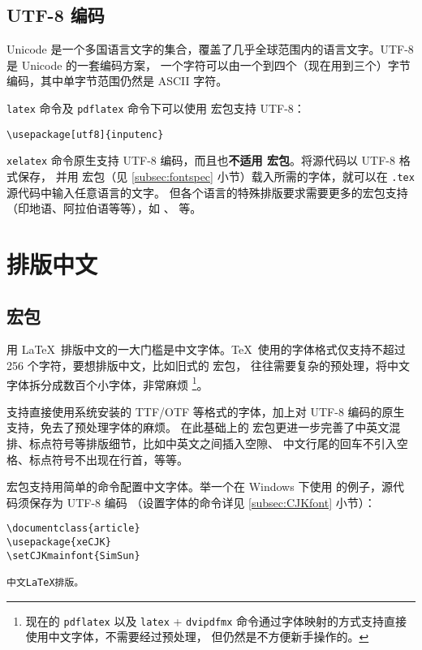 \subsection{UTF-8 编码}\label{subsec:utf8}

Unicode 是一个多国语言文字的集合，覆盖了几乎全球范围内的语言文字。UTF-8 是 Unicode 的一套编码方案，
一个字符可以由一个到四个（现在用到三个）字节编码，其中单字节范围仍然是 ASCII 字符。

\texttt{latex} 命令及 \texttt{pdflatex} 命令下可以使用  宏包支持 UTF-8：
\begin{verbatim}
\usepackage[utf8]{inputenc}
\end{verbatim}

\texttt{xelatex} 命令原生支持 UTF-8 编码，而且也\textbf{不适用  宏包}。将源代码以 UTF-8 格式保存，
并用  宏包（见 \ref{subsec:fontspec} 小节）载入所需的字体，就可以在 \texttt{.tex} 源代码中输入任意语言的文字。
但各个语言的特殊排版要求需要更多的宏包支持（印地语、阿拉伯语等等），如 、  等。

\section{排版中文}

\subsection{ 宏包}

用 \LaTeX\ 排版中文的一大门槛是中文字体。\TeX\ 使用的字体格式仅支持不超过 256 个字符，要想排版中文，比如旧式的  宏包，
往往需要复杂的预处理，将中文字体拆分成数百个小字体，非常麻烦%
\footnote{现在的 \texttt{pdflatex} 以及 \texttt{latex} + \texttt{dvipdfmx} 命令通过字体映射的方式支持直接使用中文字体，不需要经过预处理，
但仍然是不方便新手操作的。}。

 支持直接使用系统安装的 TTF/OTF 等格式的字体，加上对 UTF-8 编码的原生支持，免去了预处理字体的麻烦。
在此基础上的  宏包更进一步完善了中英文混排、标点符号等排版细节，比如中英文之间插入空隙、
中文行尾的回车不引入空格、标点符号不出现在行首，等等。

 宏包支持用简单的命令配置中文字体。举一个在 Windows 下使用  的例子，源代码须保存为 UTF-8 编码
（设置字体的命令详见 \ref{subsec:CJKfont} 小节）：
\begin{verbatim}
\documentclass{article}
\usepackage{xeCJK}
\setCJKmainfont{SimSun}

中文LaTeX排版。

\end{verbatim}

